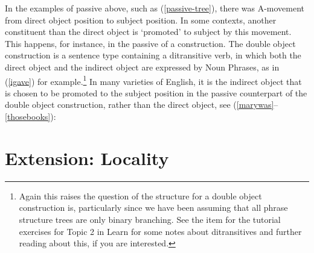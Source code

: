 \documentclass{article}
\begin{document}
In the examples of passive above, such as (\ref{passive-tree}), there was A-movement from direct object position to subject position.
In some contexts, another constituent than the direct object is `promoted' to subject by this movement.
This happens, for instance, in the passive of a  construction.
The double object construction is a sentence type containing a ditransitive verb, in which both the direct object and the indirect object are expressed by Noun Phrases, as in (\ref{igave}) for example.\footnote{Again this raises the question of the structure for a double object construction is, particularly since we have been assuming that all phrase structure trees are only binary branching.
See the item for the tutorial exercises for Topic 2 in Learn for some notes about ditransitives and further reading about this, if you are interested. }
In many varieties of English, it is the indirect object that is chosen to be promoted to the subject position in the passive counterpart of the double object construction, rather than the direct object, see (\ref{marywas}--\ref{thosebooks}):
\begin{exe}
\end{exe}

\section{Extension: Locality}
\end{document}
